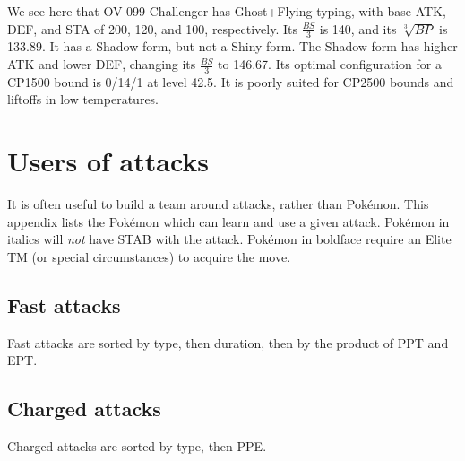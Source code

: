 \documentclass[ebook,10pt,openany,oneside]{memoir}
\begin{document}
\bigskip\noindent{}We see here that OV-099 Challenger has Ghost+Flying typing, with base ATK, DEF, and STA
of 200, 120, and 100, respectively. Its $\frac{BS}{3}$ is 140, and its $\sqrt[3]{BP}$ is 133.89.
It has a Shadow form, but not a Shiny form. The Shadow form has higher ATK and lower DEF, changing
its $\frac{BS}{3}$ to 146.67. Its optimal configuration for a CP1500 bound is 0/14/1 at level 42.5.
It is poorly suited for CP2500 bounds and liftoffs in low temperatures.
\clearpage


\chapter{Users of attacks\label{chap:attackemployers}}
It is often useful to build a team around attacks, rather than Pokémon.
This appendix lists the Pokémon which can learn and use a given attack.
Pokémon in italics will \textit{not} have STAB with the attack.
Pokémon in boldface require an Elite TM (or special circumstances) to acquire the move.
\section{Fast attacks\label{sec:usersfast}}
Fast attacks are sorted by type, then duration, then by the product of PPT and EPT\@.

\section{Charged attacks\label{sec:userscharged}}
Charged attacks are sorted by type, then PPE\@.

\backmatter

\end{document}
